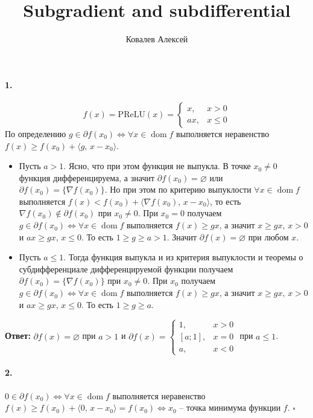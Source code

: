 \documentclass{article}
\title{Subgradient and subdifferential}
\author{Ковалев Алексей}
\date{}
\DeclareMathOperator{\dom}{dom}
\newcommand*{\QED}{\null\nobreak\hfill\ensuremath{\square}}
\begin{document}
\maketitle

\paragraph{1.}
\[ f(x) = \text{PReLU}(x) = \begin{cases}
    x, & x > 0 \\
    ax, & x \leqslant 0
\end{cases} \]
По определению $ g \in \partial f(x_0) \iff \forall x \in \dom f $ выполняется неравенство $ f(x) \geqslant f(x_0) + \langle g,\, x - x_0 \rangle $.
\begin{itemize}
    \item Пусть $a > 1$. Ясно, что при этом функция не выпукла. В точке $x_0 \neq 0$ функция дифференцируема, а значит $\partial f(x_0) = \varnothing$ или $\partial f(x_0) = \{ \nabla f(x_0) \}$. Но при этом по критерию выпуклости $\forall x \in \dom f$ выполняется $f(x) < f(x_0) + \langle \nabla f(x_0),\, x - x_0 \rangle$, то есть $\nabla f(x_0) \not \in \partial f(x_0)$ при $x_0 \neq 0$.
        При $x_0 = 0$ получаем $g \in \partial f(x_0) \iff \forall x \in \dom f$ выполняется $f(x) \geqslant gx$, а значит $x \geqslant gx,\, x > 0$ и $ax \geqslant gx,\, x \leqslant 0$. То есть $1 \geqslant g \geqslant a > 1$. Значит $\partial f(x) = \varnothing$ при любом $x$.
    \item Пусть $a \leqslant 1$. Тогда функция выпукла и из критерия выпуклости и теоремы о субдифференциале дифференцируемой функции получаем $\partial f(x_0) = \{ \nabla f(x_0) \}$ при $x_0 \neq 0$.
        При $x_0$ получаем $g \in \partial f(x_0) \iff \forall x \in \dom f$ выполняется $f(x) \geqslant gx$, а значит $x \geqslant gx,\, x > 0$ и $ax \geqslant gx,\, x \leqslant 0$. То есть $1 \geqslant g \geqslant a$.
\end{itemize}
\textbf{Ответ:} $\partial f(x) = \varnothing$ при $a > 1$ и $\partial f(x) = \begin{cases} 1, & x > 0 \\ [a; 1], & x = 0 \\ a, & x < 0 \end{cases}$ при $a \leqslant 1$.


\paragraph{2.} $0 \in \partial f(x_0) \iff \forall x \in \dom f$ выполняется неравенство $f(x) \geqslant f(x_0) + \langle 0,\, x - x_0 \rangle = f(x_0) \iff x_0$ -- точка минимума функции $f$. \QED 
\end{document}
